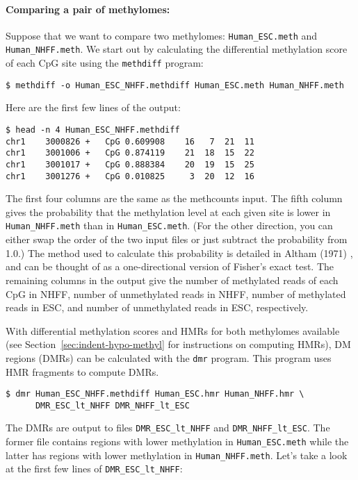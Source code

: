 \documentclass[10pt]{article}
\newcommand{\prog}[1]{\texttt{#1}}
\newcommand{\fn}[1]{\texttt{#1}}
\begin{document}
\paragraph{Comparing a pair of methylomes:} 
Suppose that we want to compare two methylomes: {\tt Human\_ESC.meth} and 
{\tt Human\_NHFF.meth}. We start out by calculating the differential 
methylation score of each CpG site using the \prog{methdiff} program:
{\small{%
\begin{verbatim}
$ methdiff -o Human_ESC_NHFF.methdiff Human_ESC.meth Human_NHFF.meth
\end{verbatim}%
}}
Here are the first few lines of the output:
{\small{%
\begin{verbatim}
$ head -n 4 Human_ESC_NHFF.methdiff
chr1	3000826	+	CpG	0.609908	16	 7	21	11
chr1	3001006	+	CpG	0.874119	21	18	15	22
chr1	3001017	+	CpG	0.888384	20	19	15	25
chr1	3001276	+	CpG	0.010825	 3	20	12	16
\end{verbatim}%
}}

The first four columns are the same as the methcounts input. The fifth 
column gives the probability that the methylation level at each given 
site is lower in \fn{Human\_NHFF.meth} than in \fn{Human\_ESC.meth}. 
(For the other direction, you can either swap the order of the two 
input files or just subtract the probability from 1.0.) The method used 
to calculate this probability is detailed in Altham (1971) 
\cite{altham1969exact}, and can be thought of as a one-directional 
version of Fisher's exact test.  The remaining columns in the output 
give the number of methylated reads of each CpG in NHFF, number of unmethylated
reads in  NHFF, number of methylated reads in ESC, and number of unmethylated
reads in ESC, respectively.

With differential methylation scores and HMRs for both methylomes 
available (see Section~\ref{sec:indent-hypo-methyl} for instructions 
on computing HMRs), DM regions (DMRs) can be calculated with the 
\prog{dmr} program. This program uses HMR fragments to compute 
DMRs.

{\small{%
\begin{verbatim}
$ dmr Human_ESC_NHFF.methdiff Human_ESC.hmr Human_NHFF.hmr \
      DMR_ESC_lt_NHFF DMR_NHFF_lt_ESC
\end{verbatim}%
}}
The DMRs are output to files {\tt DMR\_ESC\_lt\_NHFF} and 
{\tt DMR\_NHFF\_lt\_ESC}. The former file contains regions with 
lower methylation in {\tt Human\_ESC.meth} while the latter  has 
regions with lower methylation in {\tt Human\_NHFF.meth}. Let's take 
a look at the first few lines of {\tt DMR\_ESC\_lt\_NHFF}:
\end{document}
